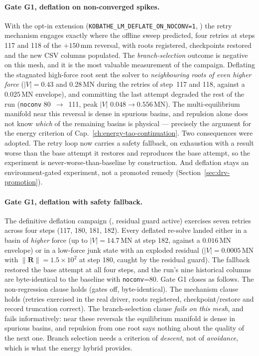 \paragraph{Gate G1, deflation on non-converged spikes.}
With the opt-in extension
(\texttt{KOBATHE\_LM\_DEFLATE\_ON\_NOCONV=1},
) the retry mechanism engages
exactly where the offline sweep predicted, four retries at steps 117 and
118 of the $+150$\,mm reversal, with roots registered, checkpoints
restored and the new CSV columns populated. The \emph{branch-selection}
outcome is negative on this mesh, and it is the most valuable
measurement of the campaign. Deflating the stagnated high-force root
sent the solver to \emph{neighbouring roots of even higher force}
($|V|=0.43$ and $0.28$\,MN during the retries of step~117 and 118,
against a $0.025$\,MN envelope), and committing the last attempt
degraded the rest of the run (\texttt{noconv} 80~$\to$~111, peak $|V|$
$0.048\to0.556$\,MN). The multi-equilibrium manifold near this reversal
is dense in spurious basins, and repulsion alone does not know
\emph{which} of the remaining basins is physical --- precisely the
argument for the energy criterion of Cap.~\ref{ch:energy-tao-continuation}.
Two consequences were adopted. The retry loop now carries a safety
fallback, on exhaustion with a result worse than the base attempt it
restores and reproduces the base attempt, so the experiment is
never-worse-than-baseline by construction. And deflation stays an
environment-gated experiment, not a promoted remedy
(Section~\ref{sec:drv-promotion}).

\paragraph{Gate G1, deflation with safety fallback.}
The definitive deflation campaign
(, residual guard active) exercises
seven retries across four steps (117, 180, 181, 182). Every deflated
re-solve landed either in a basin of \emph{higher} force (up to
$|V|=14.7$\,MN at step 182, against a $0.016$\,MN envelope) or in a
low-force junk state with an exploded residual ($|V|=0.0005$\,MN with
$\lVert\mathbf R\rVert=1.5\times10^{2}$ at step 180, caught by the
residual guard). The fallback restored the base attempt at all four
steps, and the run's nine historical columns are byte-identical to the
baseline with \texttt{noconv}=80. Gate G1 closes as follows. The
non-regression clause holds (gates off, byte-identical). The mechanism
clause holds (retries exercised in the real driver, roots registered,
checkpoint/restore and record truncation correct). The branch-selection
clause \emph{fails on this mesh}, and fails informatively: near these
reversals the equilibrium manifold is dense in spurious basins, and
repulsion from one root says nothing about the quality of the next one.
Branch selection needs a criterion of \emph{descent}, not of
\emph{avoidance}, which is what the energy hybrid provides.

